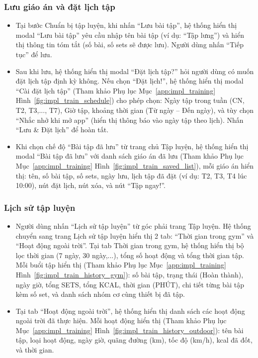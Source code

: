 \subsubsection{Lưu giáo án và đặt lịch tập}

\begin{itemize}
    \item Tại bước Chuẩn bị tập luyện, khi nhấn ``Lưu bài tập'', hệ thống hiển thị modal ``Lưu bài tập'' yêu cầu nhập tên bài tập (ví dụ: ``Tập lưng'') và hiển thị thông tin tóm tắt (số bài, số sets sẽ được lưu). Người dùng nhấn ``Tiếp tục'' để lưu.


    \item Sau khi lưu, hệ thống hiển thị modal ``Đặt lịch tập?'' hỏi người dùng có muốn đặt lịch tập định kỳ không. Nếu chọn ``Đặt lịch!'', hệ thống hiển thị modal ``Cài đặt lịch tập'' (Tham khảo Phụ lục Mục~\ref{app:impl_training} Hình~\ref{fig:impl_train_schedule}) cho phép chọn: Ngày tập trong tuần (CN, T2, T3,..., T7), Giờ tập, khoảng thời gian (Từ ngày -- Đến ngày), và tùy chọn ``Nhắc nhở khi mở app'' (hiển thị thông báo vào ngày tập theo lịch). Nhấn ``Lưu \& Đặt lịch'' để hoàn tất.


    \item Khi chọn chế độ ``Bài tập đã lưu'' từ trang chủ Tập luyện, hệ thống hiển thị modal ``Bài tập đã lưu'' với danh sách giáo án đã lưu (Tham khảo Phụ lục Mục~\ref{app:impl_training} Hình~\ref{fig:impl_train_saved_list}), mỗi giáo án hiển thị: tên, số bài tập, số sets, ngày lưu, lịch tập đã đặt (ví dụ: T2, T3, T4 lúc 10:00), nút đặt lịch, nút xóa, và nút ``Tập ngay!''.

\end{itemize}

\subsubsection{Lịch sử tập luyện}

\begin{itemize}
    \item Người dùng nhấn ``Lịch sử tập luyện'' từ góc phải trang Tập luyện. Hệ thống chuyển sang trang Lịch sử tập luyện hiển thị 2 tab: ``Thời gian trong gym'' và ``Hoạt động ngoài trời''. Tại tab Thời gian trong gym, hệ thống hiển thị bộ lọc thời gian (7 ngày, 30 ngày,...), tổng số hoạt động và tổng thời gian tập. Mỗi buổi tập hiển thị (Tham khảo Phụ lục Mục~\ref{app:impl_training} Hình~\ref{fig:impl_train_history_gym}): số bài tập, trạng thái (Hoàn thành), ngày giờ, tổng SETS, tổng KCAL, thời gian (PHÚT), chi tiết từng bài tập kèm số set, và danh sách nhóm cơ cùng thiết bị đã tập.


    \item Tại tab ``Hoạt động ngoài trời'', hệ thống hiển thị danh sách các hoạt động ngoài trời đã thực hiện. Mỗi hoạt động hiển thị (Tham khảo Phụ lục Mục~\ref{app:impl_training} Hình~\ref{fig:impl_train_history_outdoor}): tên bài tập, loại hoạt động, ngày giờ, quãng đường (km), tốc độ (km/h), kcal đã đốt, và thời gian.

\end{itemize}

